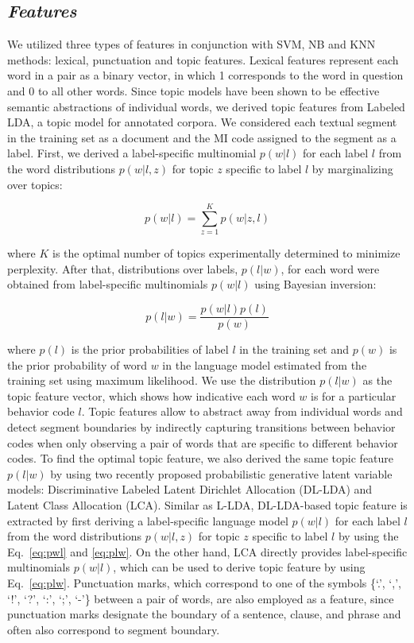 \documentclass{amia}
\begin{document}
\subsection*{\textit{Features}}

We utilized three types of features in conjunction with SVM, NB and KNN methods: lexical, punctuation and topic features. Lexical features represent each word in a pair as a binary vector, in which 1 corresponds to the word in question and 0 to all other words. Since topic models\cite{kotov2015interpretable,hashimoto2016topic,lu2016modeling} have been shown to be effective semantic abstractions of individual words, we derived topic features from Labeled LDA\cite{ramage2009labeled}, a topic model for annotated corpora. We considered each textual segment in the training set as a document and the MI code assigned to the segment as a label. First, we derived a label-specific multinomial $p(w|l)$ for each label $l$ from the word distributions $p(w|l,z)$ for topic $z$ specific to label $l$ by marginalizing over topics: 

\begin{equation}
\label{eq:pwl}
p(w|l) = {\sum_{z=1}^{K}{p(w|z,l)}}
\end{equation}

where $K$ is the optimal number of topics experimentally determined to minimize perplexity. After that, distributions over labels, $p(l|w)$, for each word were obtained from label-specific multinomials $p(w|l)$ using Bayesian inversion: 

\begin{equation}
\label{eq:plw}
p(l|w) = \frac{p(w|l)p(l)}{p(w)}
\end{equation}

where $p(l)$ is the prior probabilities of label $l$ in the training set and $p(w)$ is the prior probability of word $w$ in the language model estimated from the training set using maximum likelihood. We use the distribution $p(l|w)$ as the topic feature vector, which shows how indicative each word $w$ is for a particular behavior code $l$. Topic features allow to abstract away from individual words and detect segment boundaries by indirectly capturing transitions between behavior codes when only observing a pair of words that are specific to different behavior codes. To find the optimal topic feature, we also derived the same topic feature $p(l|w)$ by using two recently proposed probabilistic generative latent variable models: Discriminative Labeled Latent Dirichlet Allocation (DL-LDA) and Latent Class Allocation (LCA)\cite{kotov2015interpretable}. Similar as L-LDA, DL-LDA-based topic feature is extracted by first deriving a label-specific language model $p(w|l)$ for each label $l$ from the word distributions $p(w|l,z)$ for topic $z$ specific to label $l$ by using the Eq.~\ref{eq:pwl} and \ref{eq:plw}. On the other hand, LCA directly provides label-specific multinomials $p(w|l)$, which can be used to derive topic feature by using Eq.~\ref{eq:plw}. Punctuation marks, which correspond to one of the symbols \{`.', `,', `!', `?', `:', `;', `-'\} between a pair of words, are also employed as a feature, since punctuation marks designate the boundary of a sentence, clause, and phrase and often also correspond to segment boundary.   
\end{document}
